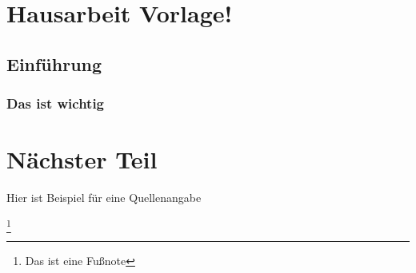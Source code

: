 \section{Hausarbeit Vorlage!}
\blindtext
\subsection{Einführung}
\blindtext
\subsubsection{Das ist wichtig}
\blindtext
\section{Nächster Teil}
Hier ist Beispiel für eine Quellenangabe \autocite[17]{test}

\blindtext\footnote{Das ist eine Fußnote}